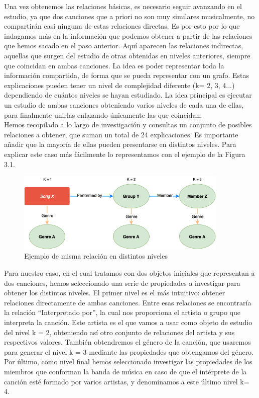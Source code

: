 Una vez obtenemos las relaciones básicas, es necesario seguir avanzando en el estudio, ya que dos canciones que a priori no son muy similares musicalmente, no compartirán casi ninguna de estas relaciones directas. Es por esto por lo que indagamos más en la información que podemos obtener a partir de las relaciones que hemos sacado en el paso anterior. Aquí aparecen las relaciones indirectas, aquellas que surgen del estudio de otras obtenidas en niveles anteriores, siempre que coincidan en ambas canciones. La idea es poder representar toda la información compartida, de forma que se pueda representar con un grafo. Estas explicaciones pueden tener un nivel de complejidad diferente (k= 2, 3, 4...) dependiendo de cuántos niveles se hayan estudiado. La idea principal es ejecutar un estudio de ambas canciones obteniendo varios niveles de cada una de ellas, para finalmente unirlas enlazando únicamente las que coincidan.\\

Hemos recopilado a lo largo de investigación y consultas un conjunto de posibles relaciones a obtener, que suman un total de 24 explicaciones. Es importante añadir que la mayoría de ellas pueden presentarse en distintos niveles. Para explicar este caso más fácilmente lo representamos con el ejemplo de la Figura 3.1.\\


\begin{figure}[h!]
	\centering
	\includegraphics[width = 0.9\textwidth]{Imagenes/Bitmap/RelationLevels.png}
	\caption{Ejemplo de misma relación en distintos niveles}
	\label{fig:sampleImage}
\end{figure}

Para nuestro caso, en el cual tratamos con dos objetos iniciales que representan a dos canciones, hemos seleccionado una serie de propiedades a investigar para obtener los distintos niveles. El primer nivel es el más intuitivo: obtener relaciones directamente de ambas canciones. Entre esas relaciones se encontraría la relación ``Interpretado por'', la cual nos proporciona el artista o grupo que interpreta la canción. Este artista es el que vamos a usar como objeto de estudio del nivel k = 2, obteniendo así otro conjunto de relaciones del artista y sus respectivos valores. También obtendremos el género de la canción, que usaremos para generar el nivel k = 3 mediante las propiedades que obtengamos del género. Por último, como nivel final hemos seleccionado investigar las propiedades de los miembros que conforman la banda de música en caso de que el intérprete de la canción esté formado por varios artistas, y denominamos a este último nivel k= 4.\\

